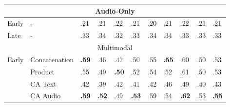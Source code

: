 \documentclass{article}
\begin{document}
\begin{table}[h]
\begin{tabular}{|lllllllllll|}
\multicolumn{11}{|c|}{Audio-Only}                                                                                                                                                                                                                                                                      \\ \hline
\multicolumn{1}{|l|}{Early}                  & \multicolumn{1}{l|}{-}             & .21                & .21                & .22                & .21                & .20                & .21                & .22                & \multicolumn{1}{l|}{.21}                & .21                   \\
\multicolumn{1}{|l|}{Late}                   & \multicolumn{1}{l|}{-}             & .33                & .34                & .32                & .33                & .34                & .34                & .33                & \multicolumn{1}{l|}{.33}                & .33                   \\ \hline
\multicolumn{11}{|c|}{Multimodal}                                                                                                                                                                                                                                                                      \\ \hline
\multicolumn{1}{|l|}{\multirow{4}{*}{Early}} & \multicolumn{1}{l|}{Concatenation} & \textbf{.59}       & .46                & .47                & .50                & .55                & \textbf{.55}       & .60                & \multicolumn{1}{l|}{.50}                & .53                   \\
\multicolumn{1}{|l|}{}                       & \multicolumn{1}{l|}{Product}       & .55                & .49                & \textbf{.50}       & .52                & .54                & .52                & .61                & \multicolumn{1}{l|}{.50}                & .53                   \\
\multicolumn{1}{|l|}{}                       & \multicolumn{1}{l|}{CA Text}       & .42                & .39                & .42                & .41                & .42                & .46                & .49                & \multicolumn{1}{l|}{.40}                & .43                   \\
\multicolumn{1}{|l|}{}                       & \multicolumn{1}{l|}{CA Audio}      & \textbf{.59}       & \textbf{.52}       & .49                & \textbf{.53}       & .59                & .54                & \textbf{.62}       & \multicolumn{1}{l|}{.53}                & \textbf{.55}          \\ \hline

\end{tabular}
\end{table}
\end{document}
